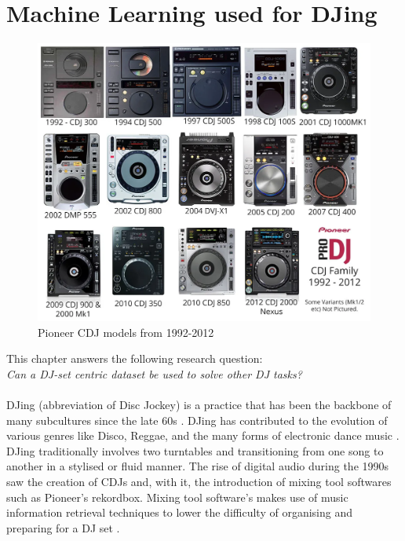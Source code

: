 
\graphicspath{{Chapter3/}}

\chapter{Machine Learning used for DJing}

\begin{figure}[H]
	\includegraphics[scale=0.3]{images/pioneers_history}
	\centering
	\caption{Pioneer CDJ models from 1992-2012 \citep{chesters_history_2017}} 
\end{figure}

This chapter answers the following research question:
\\

\textit{Can a DJ-set centric dataset be used to solve other DJ tasks?} 
\\
\\
DJing (abbreviation of Disc Jockey) is a practice that has been the backbone of many subcultures since the late 60s \citep{brewster_last_2014}. DJing has contributed to the evolution of various genres like Disco, Reggae, and the many forms of electronic dance music \citep{partridge_dub_2010, reynolds_energy_2013}. DJing traditionally involves two turntables and transitioning from one song to another in a stylised or fluid manner. The rise of digital audio during the 1990s saw the creation of CDJs and, with it, the introduction of mixing tool softwares such as Pioneer's rekordbox. Mixing tool software's makes use of music information retrieval techniques to lower the difficulty of organising and preparing for a DJ set \citep{kim_automatic_2017}. 

